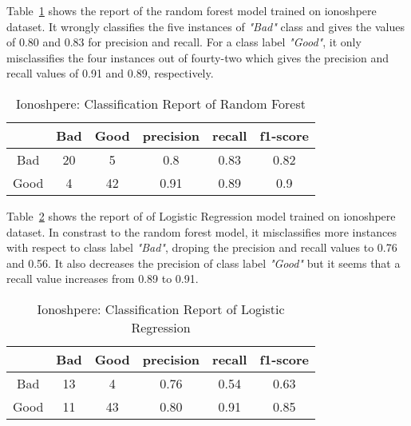 \documentclass[english]{tktltiki2}
\theoremstyle{definition}
\theoremstyle{remark}
\begin{document}
Table~\ref{table:rf_model_iono_report} shows the report of the random forest model trained on ionoshpere dataset. It wrongly classifies the five instances of \textit{"Bad"} class and gives the values of 0.80 and 0.83 for precision and recall. For a class label \textit{"Good"}, it only misclassifies the four instances out of fourty-two which gives the precision and recall values of 0.91 and 0.89, respectively.

\begin{table}[H]
	\begin{center}
		\caption{Ionoshpere: Classification Report of Random Forest}
		\label{table:rf_model_iono_report}
		\begin{tabular}{@{}cccccc@{}}
			\toprule
			& Bad & Good & precision & recall & f1-score \\ \hline
			\multicolumn{1}{|c|}{Bad} & \multicolumn{1}{c|}{20} & \multicolumn{1}{c|}{5} & \multicolumn{1}{c|}{0.8} & \multicolumn{1}{c|}{0.83} & \multicolumn{1}{c|}{0.82} \\ \hline
			\multicolumn{1}{|c|}{Good} & \multicolumn{1}{c|}{4} & \multicolumn{1}{c|}{42} & \multicolumn{1}{c|}{0.91} & \multicolumn{1}{c|}{0.89} & \multicolumn{1}{c|}{0.9} \\ \hline
		\end{tabular}
	\end{center}
\end{table}

Table~\ref{table:lr_model_iono_report} shows the report of of Logistic Regression model trained on ionoshpere dataset. In constrast to the random forest model, it misclassifies more instances with respect to class label \textit{"Bad"}, droping the precision and recall values to 0.76 and 0.56. It also decreases the precision of class label \textit{"Good"} but it seems that a recall value increases from 0.89 to 0.91.

\begin{table}[H]
	\begin{center}
		\caption{Ionoshpere: Classification Report of Logistic Regression}
		\label{table:lr_model_iono_report}
		\begin{tabular}{@{}cccccc@{}}
			\toprule
			& Bad & Good & precision & recall & f1-score \\ \hline
			\multicolumn{1}{|c|}{Bad} & \multicolumn{1}{c|}{13} & \multicolumn{1}{c|}{4} & \multicolumn{1}{c|}{0.76} & \multicolumn{1}{c|}{0.54} & \multicolumn{1}{c|}{0.63} \\ \hline
			\multicolumn{1}{|c|}{Good} & \multicolumn{1}{c|}{11} & \multicolumn{1}{c|}{43} & \multicolumn{1}{c|}{0.80} & \multicolumn{1}{c|}{0.91} & \multicolumn{1}{c|}{0.85} \\ \hline
		\end{tabular}
	\end{center}
\end{table}
\end{document}
